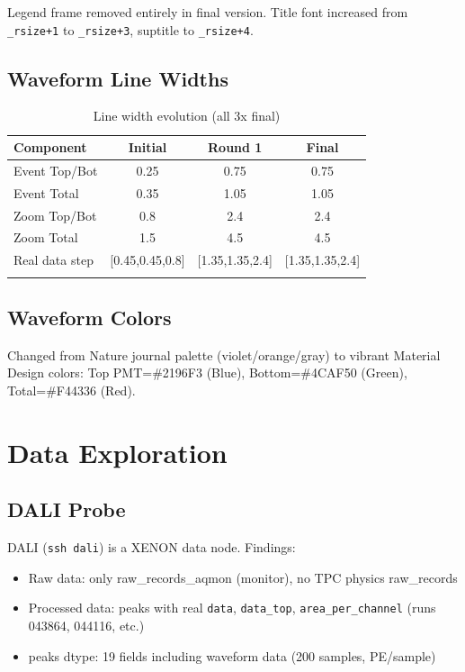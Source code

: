 \documentclass[12pt,a4paper]{article}
\begin{document}
Legend frame removed entirely in final version. Title font increased from \texttt{\_rsize+1} to \texttt{\_rsize+3}, suptitle to \texttt{\_rsize+4}.

\subsection{Waveform Line Widths}

\begin{longtable}{|l|c|c|c|}
\hline
\textbf{Component} & \textbf{Initial} & \textbf{Round 1} & \textbf{Final} \\
\hline
Event Top/Bot & 0.25 & 0.75 & 0.75 \\
Event Total & 0.35 & 1.05 & 1.05 \\
Zoom Top/Bot & 0.8 & 2.4 & 2.4 \\
Zoom Total & 1.5 & 4.5 & 4.5 \\
Real data step & [0.45,0.45,0.8] & [1.35,1.35,2.4] & [1.35,1.35,2.4] \\
\hline
\caption{Line width evolution (all 3x final)}
\end{longtable}

\subsection{Waveform Colors}
Changed from Nature journal palette (violet/orange/gray) to vibrant Material Design colors: Top PMT=\#2196F3 (Blue), Bottom=\#4CAF50 (Green), Total=\#F44336 (Red).

\section{Data Exploration}

\subsection{DALI Probe}
DALI (\texttt{ssh dali}) is a XENON data node. Findings:
\begin{itemize}[itemsep=2pt]
\item Raw data: only raw\_records\_aqmon (monitor), no TPC physics raw\_records
\item Processed data: peaks with real \texttt{data}, \texttt{data\_top}, \texttt{area\_per\_channel} (runs 043864, 044116, etc.)
\item peaks dtype: 19 fields including waveform data (200 samples, PE/sample)
\end{itemize}
\end{document}
